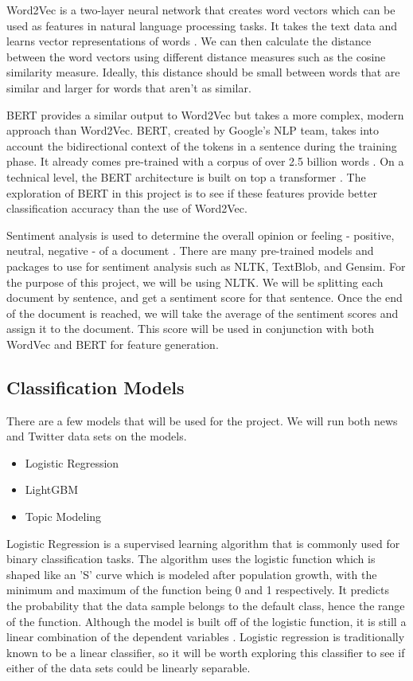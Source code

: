 \documentclass[conference]{IEEEtran}
\begin{document}
Word2Vec is a two-layer neural network that creates word vectors which can be used as features in natural language processing tasks. It takes the text data and learns vector representations of words \cite{b3}. We can then calculate the distance between the word vectors using different distance measures such as the cosine similarity measure. Ideally, this distance should be small between words that are similar and larger for words that aren't as similar.

BERT provides a similar output to Word2Vec but takes a more complex, modern approach than Word2Vec. BERT, created by Google's NLP team, takes into account the bidirectional context of the tokens in a sentence during the training phase. It already comes pre-trained with a corpus of over 2.5 billion words \cite{b13}. On a technical level, the BERT architecture is built on top a transformer \cite{b11}. The exploration of BERT in this project is to see if these features provide better classification accuracy than the use of Word2Vec.

Sentiment analysis is used to determine the overall opinion or feeling - positive, neutral, negative - of a document \cite{b8}. There are many pre-trained models and packages to use for sentiment analysis such as NLTK, TextBlob, and Gensim. For the purpose of this project, we will be using NLTK. We will be splitting each document by sentence, and get a sentiment score for that sentence. Once the end of the document is reached, we will take the average of the sentiment scores and assign it to the document. This score will be used in conjunction with both WordVec and BERT for feature generation.

\subsection{Classification Models}
There are a few models that will be used for the project. We will run both news and Twitter data sets on the models.
\begin{itemize}
    \item Logistic Regression
    \item LightGBM
    \item Topic Modeling
\end{itemize}

Logistic Regression is a supervised learning algorithm that is commonly used for binary classification tasks. The algorithm uses the logistic function which is shaped like an 'S' curve which is modeled after population growth, with the minimum and maximum of the function being 0 and 1 respectively. It predicts the probability that the data sample belongs to the default class, hence the range of the function. Although the model is built off of the logistic function, it is still a linear combination of the dependent variables \cite{b7}. Logistic regression is traditionally known to be a linear classifier, so it will be worth exploring this classifier to see if either of the data sets could be linearly separable.
\end{document}
